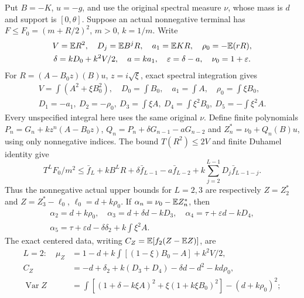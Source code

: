 Put $B=-K$, $u=-g$, and use the original spectral measure $\nu$,
whose mass is $d$ and support is $[0,\theta]$.
Suppose an actual nonnegative terminal has
$F\le F_0=(m+R/2)^2$, $m>0$, $k=1/m$.
Write
\[
\begin{gathered}
V=\mathbb E R^2,\quad D_j=\mathbb E B^jR,\quad a_1=\mathbb E KR,\quad
\rho_0=-\mathbb E(rR),\\
\delta=kD_0+k^2V/2,\quad a=ka_1,\quad
\varepsilon=\delta-a,\quad\nu_0=1+\varepsilon.
\end{gathered}
\]
For $R=(A-B_0z)(B)u$, $z=i\sqrt\xi$, exact spectral integration gives
\begin{equation}\tag{L77.1.4}\label{eq:L77:spectral}
\begin{gathered}
V=\int(A^2+\xi B_0^2),\quad D_0=\int B_0,\quad a_1=\int A,
\quad\rho_0=\int\xi B_0,\\
D_1=-a_1,\ D_2=-\rho_0,\ D_3=\int\xi A,
\ D_4=\int\xi^2B_0,\ D_5=-\int\xi^2A.
\end{gathered}
\end{equation}
Every unspecified integral here uses the same original $\nu$.
Define finite polynomials
$P_n=G_n+kz^n(A-B_0z)$,
$Q_n=P_n+\delta G_{n-1}-aG_{n-2}$ and
$Z_n^*=\nu_0+Q_n(B)u$, using only nonnegative indices.
The bound $T(R^2)\le2V$ and finite Duhamel identity give
\begin{equation}\tag{L77.1.6}\label{eq:L77:propagation}
T^LF_0/m^2\le\bar f_L+kB^LR+\delta\bar f_{L-1}-a\bar f_{L-2}
+k\sum_{j=2}^{L-1}D_j\bar f_{L-1-j}.
\end{equation}
Thus the nonnegative actual upper bounds for $L=2,3$ are respectively
$Z=Z_2^*$ and $Z=Z_3^*-\ell_0$, $\ell_0=d+k\rho_0$.
If $\alpha_n=\nu_0-\mathbb E Z_n^*$, then
\[
\begin{gathered}
\alpha_2=d+k\rho_0,\quad \alpha_3=d+\delta d-kD_3,\quad \alpha_4=\tau+\varepsilon d-kD_4,\\
\alpha_5=\tau+\varepsilon d-\delta\delta_2+k\int\xi^2A.
\end{gathered}
\]
The exact centered data, writing $C_Z=\mathbb E[f_2(Z-\mathbb E Z)]$, are
\begin{equation}\tag{L77.1.8}\label{eq:L77:twomoments}
\begin{aligned}
L=2:\quad\mu_Z&=1-d+k\int[(1-\xi)B_0-A]+k^2V/2,\\
C_Z&=-d+\delta_2+k(D_3+D_4)-\delta d-d^2-kd\rho_0,\\
\operatorname{Var}Z&=\int[(1+\delta-k\xi A)^2+
\xi(1+k\xi B_0)^2]-(d+k\rho_0)^2;
\end{aligned}
\end{equation}

